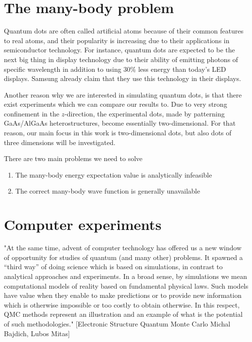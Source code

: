 \section{The many-body problem}


Quantum dots are often called artificial atoms because of their common features to real atoms, and their popularity is increasing due to their applications in semiconductor technology. For instance, quantum dots are expected to be the next big thing in display technology due to their ability of emitting photons of specific wavelength in addition to using 30\% less energy than today's LED displays.\cite{manders_8.3:_2015} Samsung already claim that they use this technology in their displays.\cite{noauthor_2019_nodate}

Another reason why we are interested in simulating quantum dots, is that there exist experiments which we can compare our results to. Due to very strong confinement in the $z$-direction, the experimental dots, made by patterning GaAs/AlGaAs heterostructures, become essentially two-dimensional. \cite{marzin_photoluminescence_1994}\cite{brunner_sharp-line_1994} For that reason, our main focus in this work is two-dimensional dots, but also dots of three dimensions will be investigated.

There are two main problems we need to solve
\begin{enumerate}
	\item The many-body energy expectation value is analytically infeasible
	\item The correct many-body wave function is generally unavailable
\end{enumerate}

\section{Computer experiments}
"At the same time, advent of computer technology has
offered us a new window of opportunity for studies of quantum (and many other) problems. It
spawned a “third way” of doing science which is based on simulations, in contrast to analytical
approaches and experiments. In a broad sense, by simulations we mean computational models of
reality based on fundamental physical laws. Such models have value when they enable to make
predictions or to provide new information which is otherwise impossible or too costly to obtain
otherwise. In this respect, QMC methods represent an illustration and an example of what is the
potential of such methodologies." [Electronic Structure Quantum Monte Carlo Michal Bajdich, Lubos Mitas]  

